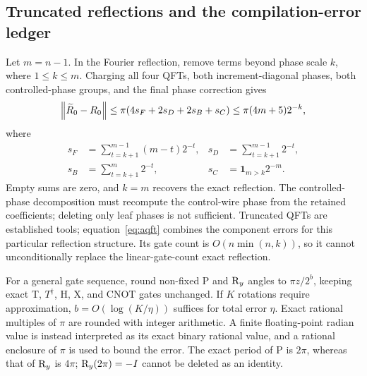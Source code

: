 \subsection{Truncated reflections and the compilation-error ledger}
Let $m=n-1$. In the Fourier reflection, remove terms beyond phase scale $k$, where $1\le k\le m$. Charging all four QFTs, both increment-diagonal phases, both controlled-phase groups, and the final phase correction gives
\begin{equation}\label{eq:aqft}
\left\lVert \widetilde R_0-R_0\right\rVert
\le\pi(4s_F+2s_D+2s_B+s_C)
\le\pi(4m+5)2^{-k},
\end{equation}
where
\begin{align*}
s_F&=\sum_{t=k+1}^{m-1}(m-t)2^{-t},&
s_D&=\sum_{t=k+1}^{m-1}2^{-t},\\
s_B&=\sum_{t=k+1}^{m}2^{-t},&
s_C&=\mathbf1_{m>k}2^{-m}.
\end{align*}
Empty sums are zero, and $k=m$ recovers the exact reflection. The controlled-phase decomposition must recompute the control-wire phase from the retained coefficients; deleting only leaf phases is not sufficient. Truncated QFTs are established tools\cite{coppersmith2002}; equation~\eqref{eq:aqft} combines the component errors for this particular reflection structure. Its gate count is $O(n\min(n,k))$, so it cannot unconditionally replace the linear-gate-count exact reflection.

For a general gate sequence, round non-fixed P and $\mathrm{R}_y$ angles to $\pi z/2^b$, keeping exact T, $T^\dagger$, H, X, and CNOT gates unchanged. If $K$ rotations require approximation, $b=O(\log(K/\eta))$ suffices for total error $\eta$. Exact rational multiples of $\pi$ are rounded with integer arithmetic. A finite floating-point radian value is instead interpreted as its exact binary rational value, and a rational enclosure of $\pi$ is used to bound the error. The exact period of P is $2\pi$, whereas that of $\mathrm{R}_y$ is $4\pi$; $\mathrm{R}_y(2\pi)=-I$ cannot be deleted as an identity.

